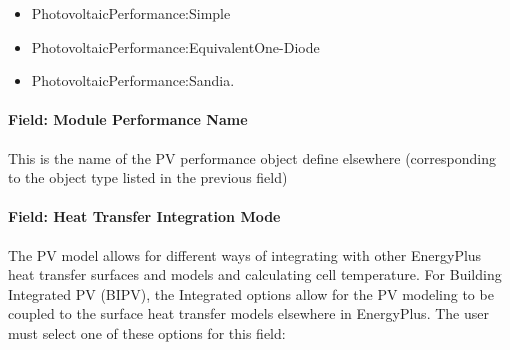 \begin{itemize}
\item
  PhotovoltaicPerformance:Simple
\item
  PhotovoltaicPerformance:EquivalentOne-Diode
\item
  PhotovoltaicPerformance:Sandia.
\end{itemize}

\paragraph{Field: Module Performance Name}\label{field-module-performance-name}

This is the name of the PV performance object define elsewhere (corresponding to the object type listed in the previous field)

\paragraph{Field: Heat Transfer Integration Mode}\label{field-heat-transfer-integration-mode}

The PV model allows for different ways of integrating with other EnergyPlus heat transfer surfaces and models and calculating cell temperature. For Building Integrated PV (BIPV), the Integrated options allow for the PV modeling to be coupled to the surface heat transfer models elsewhere in EnergyPlus. The user must select one of these options for this field:

